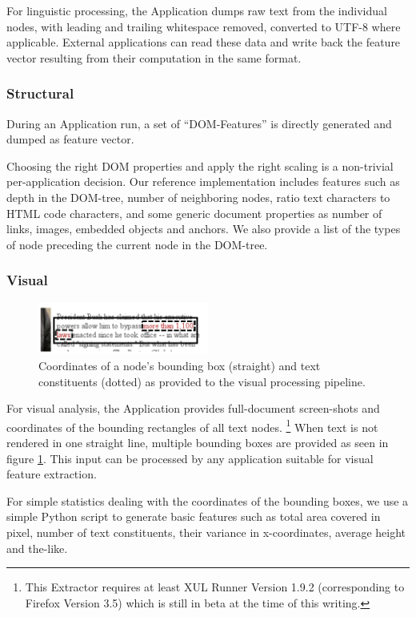 For linguistic processing, the Application dumps raw text from the individual nodes, with leading and trailing whitespace removed, converted to UTF-8 where applicable.
External applications can read these data and write back the feature vector resulting from their computation in the same format.

\subsubsection{Structural}

During an Application run, a set of ``DOM-Features'' is directly generated and dumped as feature vector.

Choosing the right DOM properties and apply the right scaling is a non-trivial per-application decision.
Our reference implementation includes features such as depth in the DOM-tree, number of neighboring nodes, ratio text characters to HTML code characters,
  and some generic document properties as number of links, images, embedded objects and anchors.
We also provide a list of the types of node preceding the current node in the DOM-tree.


\subsubsection{Visual}

\begin{figure}
\includegraphics[width=0.5\textwidth]{vizwrap}
\caption{\label{f:vizwrap}Coordinates of a node's bounding box (straight) and text constituents (dotted) as provided to the visual processing pipeline.}
\end{figure}

For visual analysis, the Application provides full-document screen-shots and coordinates of the bounding rectangles of all text nodes.%
\footnote{This Extractor requires at least XUL Runner Version 1.9.2 (corresponding to Firefox Version 3.5) which is still in beta at the time of this writing.}
When text is not rendered in one straight line, multiple bounding boxes are provided as seen in figure \ref{f:vizwrap}.
This input can be processed by any application suitable for visual feature extraction.

For simple statistics dealing with the coordinates of the bounding boxes, we use a simple Python script to generate basic features such as total area covered in pixel, number of text constituents, their variance in x-coordinates, average height and the-like.

